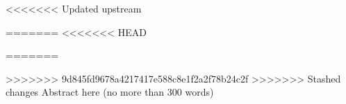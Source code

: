 <<<<<<< Updated upstream

=======
<<<<<<< HEAD

=======

>>>>>>> 9d845fd9678a4217417e588c8e1f2a2f78b24c2f
>>>>>>> Stashed changes
Abstract here (no more than 300 words)